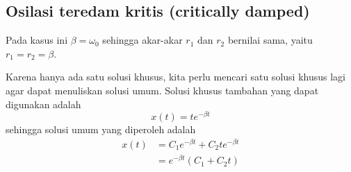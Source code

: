 \subsection*{Osilasi teredam kritis (critically damped)}

Pada kasus ini $\beta=\omega_{0}$ sehingga
akar-akar $r_{1}$ dan $r_{2}$ bernilai sama, yaitu $r_{1} = r_{2} = \beta$.

Karena hanya ada satu solusi khusus, kita perlu mencari satu solusi khusus
lagi agar dapat menuliskan solusi umum. Solusi khusus tambahan yang
dapat digunakan adalah
\begin{equation}
x(t) = te^{-\beta t}
\end{equation}
sehingga solusi umum yang diperoleh adalah
\begin{align*}
x(t) & = C_{1}e^{-\beta t} + C_{2}te^{-\beta t} \\
     & = e^{-\beta t}\left(C_{1} + C_{2}t \right)
\end{align*}